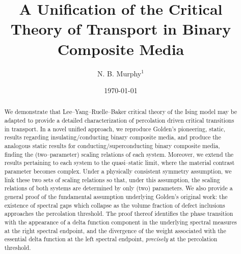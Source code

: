 \documentclass[jmp,graphicx]{revtex4-1}
\begin{document}

\title{A Unification of the Critical Theory of Transport in Binary
  Composite Media} %



\author{N. B. Murphy$^1$}
%


\date{\today}

\begin{abstract}
%
We demonstrate that Lee--Yang--Ruelle--Baker critical theory of the
Ising model may be adapted to provide a detailed characterization of
percolation driven critical transitions in transport. In a novel
unified approach, we reproduce Golden's pioneering, static, results
regarding insulating/conducting binary composite media, and produce
the analogous static results for conducting/superconducting binary
composite media, finding the (two--parameter) scaling relations of
each system. Moreover, we extend the results pertaining to each system
to the quasi--static limit, where the material contrast parameter
becomes complex. Under a physically consistent symmetry assumption, we
link these two sets of scaling relations so that, under this
assumption, the scaling relations of both systems are determined by
only (two) parameters. We also provide a general proof of the
fundamental assumption underlying Golden's original work: the
existence of spectral gaps which collapse as the volume fraction of
defect inclusions approaches the percolation threshold. The proof
thereof identifies the phase transition with the appearance of a delta
function component in the underlying spectral measures at the right
spectral endpoint, and the divergence of the weight associated with
the essential delta function at the left spectral endpoint,
\emph{precisely} at the percolation threshold.  
%
\end{abstract}
\end{document}
